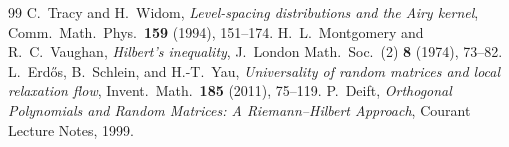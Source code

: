 \documentclass[12pt,a4paper]{amsart}
\begin{document}
\begin{thebibliography}{99}
C.~Tracy and H.~Widom,
\textit{Level-spacing distributions and the Airy kernel},
Comm.\ Math.\ Phys.\ \textbf{159} (1994), 151--174.
H.~L.~Montgomery and R.~C.~Vaughan,
\textit{Hilbert's inequality},
J.\ London Math.\ Soc.\ (2) \textbf{8} (1974), 73--82.
L.~Erd\H{o}s, B.~Schlein, and H.-T.~Yau,
\textit{Universality of random matrices and local relaxation flow},
Invent.\ Math.\ \textbf{185} (2011), 75--119.
P.~Deift,
\textit{Orthogonal Polynomials and Random Matrices: A Riemann--Hilbert Approach},
Courant Lecture Notes, 1999.
\end{thebibliography}
\end{document}
